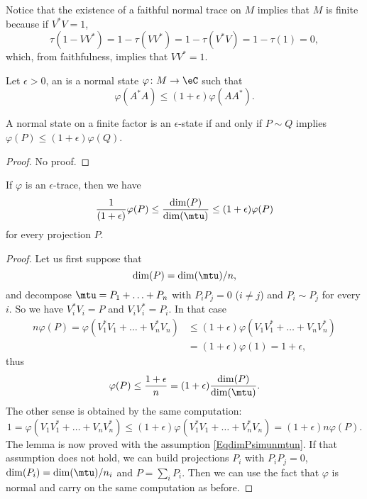 Notice that the existence of a faithful normal trace on $M$ implies that $M$ is finite because if $V^*V=1$,
\[ 
	\tau(1-VV^*)=1-\tau(VV^*)=1-\tau(V^*V)=1-\tau(1)=0,
\]
which, from faithfulness, implies that $VV^*=1$.

Let $\epsilon>0$, an  is a normal state $\varphi\colon M\to \eC$ such that
\begin{equation}
	\varphi(A^*A)\leq (1+\epsilon)\varphi(AA^*).
\end{equation}

\begin{lemma}
A normal state on a finite factor is an $\epsilon$-state if and only if $P\sim Q$ implies $\varphi(P)\leq (1+\epsilon)\varphi(Q)$.
\end{lemma}

\begin{proof}
No proof.
\end{proof}

\begin{lemma}
If $\varphi$ is an $\epsilon$-trace, then we have
\begin{equation}
	\frac{1}{ (1+\epsilon) }\varphi(P)\leq\frac{ \dim(P) }{ \dim(\mtu) }\leq (1+\epsilon)\varphi(P)
\end{equation}
for every projection $P$.
\end{lemma}

\begin{proof}
Let us first suppose that 
\begin{equation}		\label{EqdimPsimunmtun}
	\dim (P)=\dim(\mtu)/n,
\end{equation}
 and decompose $\mtu=P_1+\ldots+P_n$ with $P_iP_j=0$ ($i\neq j$) and $P_i\sim P_j$ for every $i$. So we have $V_i^*V_i=P$ and $V_iV_i^*=P_i$. In that case
\begin{equation}
\begin{split}
	n\varphi(P)=\varphi(V_1^*V_1+\ldots+V_n^*V_n)&\leq(1+\epsilon)\varphi(V_1V_1^*+\ldots+V_nV_n^*)\\
							&=(1+\epsilon)\varphi(1)=1+\epsilon,
\end{split}
\end{equation}
thus
\begin{equation}
	\varphi(P)\leq\frac{ 1+\epsilon }{ n }=(1+\epsilon)\frac{ \dim(P) }{ \dim(\mtu) }.
\end{equation}
The other sense is obtained by the same computation:
\[ 
	1=\varphi(V_1V_1^*+\ldots+V_nV_n^*)\leq (1+\epsilon)\varphi(V_1^*V_1+\ldots+V_n^*V_n)=(1+\epsilon)n\varphi(P).
\]
The lemma is now proved with the assumption \eqref{EqdimPsimunmtun}. If that assumption does not hold, we can build projections $P_i$ with $P_iP_j=0$, $\dim(P_i)= \dim(\mtu)/ n_i $ and $P=\sum_iP_i$. Then we can use the fact that $\varphi$ is normal and carry on the same computation as before.
\end{proof}

